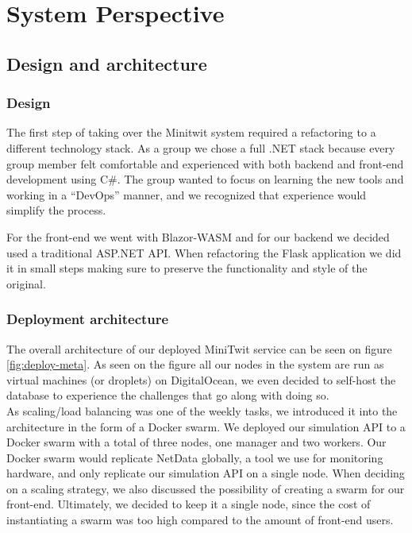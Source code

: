 \section{System Perspective}
\subsection{Design and architecture}

\subsubsection{Design}
The first step of taking over the Minitwit system required a refactoring to a different technology stack. 
As a group we chose a full .NET stack because every group member felt comfortable and experienced with both backend and front-end development using C\#. The group wanted to focus on learning the new tools and working in a “DevOps” manner, and we recognized that experience would simplify the process.

For the front-end we went with Blazor-WASM and for our backend we decided used a traditional ASP.NET API. When refactoring the Flask application we did it in small steps making sure to preserve the functionality and style of the original.

\subsubsection{Deployment architecture}
The overall architecture of our deployed MiniTwit service can be seen on figure \ref{fig:deploy-meta}. As seen on the figure all our nodes in the system are run as virtual machines (or droplets) on DigitalOcean, we even decided to self-host the database to experience the challenges that go along with doing so.
\\
As scaling/load balancing was one of the weekly tasks, we introduced it into the architecture in the form of a Docker swarm. We deployed our simulation API to a Docker swarm with a total of three nodes, one manager and two workers. Our Docker swarm would replicate NetData globally, a tool we use for monitoring hardware, and only replicate our simulation API on a single node.
When deciding on a scaling strategy, we also discussed the possibility of creating a swarm for our front-end. Ultimately, we decided to keep it a single node, since the cost of instantiating a swarm was too high compared to the amount of front-end users.

